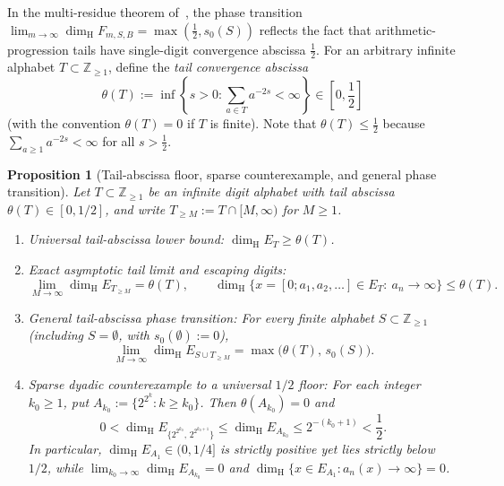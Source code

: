 \documentclass[11pt]{article}
\newtheorem{proposition}[theorem]{Proposition}
\theoremstyle{definition}
\theoremstyle{remark}
\newcommand{\Z}{\mathbb{Z}}
\newcommand{\dimH}{\dim_{\mathrm{H}}}
\begin{document}
In the multi-residue theorem of~\cite{Paper2}, the phase
transition $\lim_{m\to\infty}\dimH F_{m,S,B}=\max(\frac12,s_0(S))$ reflects
the fact that arithmetic-progression tails have single-digit convergence
abscissa $\frac12$. For an arbitrary infinite alphabet $T\subset\Z_{\ge1}$,
define the \emph{tail convergence abscissa}
\[
\theta(T):=\inf\left\{s>0:\sum_{a\in T}a^{-2s}<\infty\right\}\in\left[0,\frac12\right]
\]
(with the convention $\theta(T)=0$ if $T$ is finite). Note that
$\theta(T)\le\frac12$ because $\sum_{a\ge1}a^{-2s}<\infty$ for all
$s>\frac12$.

\begin{proposition}[Tail-abscissa floor, sparse counterexample, and general phase transition]\label{prop:sparse-tail-phase}
Let $T\subset\Z_{\ge1}$ be an infinite digit alphabet with tail abscissa
$\theta(T)\in[0,1/2]$, and write $T_{\ge M}:=T\cap[M,\infty)$ for $M\ge1$.
\begin{enumerate}[label=\textup{(\roman*)},leftmargin=2.2em]
\item \emph{Universal tail-abscissa lower bound:}
$\dimH E_T\ge\theta(T)$.
\item \emph{Exact asymptotic tail limit and escaping digits:}
\[
\lim_{M\to\infty}\dimH E_{T_{\ge M}}=\theta(T),
\qquad
\dimH\bigl\{x=[0;a_1,a_2,\dots]\in E_T:\ a_n\to\infty\bigr\}\le\theta(T).
\]
\item \emph{General tail-abscissa phase transition:}
For every finite alphabet $S\subset\Z_{\ge1}$ (including $S=\emptyset$, with
$s_0(\emptyset):=0$),
\begin{equation}\label{eq:general-tail-phase}
\lim_{M\to\infty}\dimH E_{S\cup T_{\ge M}}=\max\bigl(\theta(T),\,s_0(S)\bigr).
\end{equation}
\item \emph{Sparse dyadic counterexample to a universal $1/2$ floor:}
For each integer $k_0\ge1$, put $A_{k_0}:=\{2^{2^k}:k\ge k_0\}$. Then
$\theta(A_{k_0})=0$ and
\begin{equation}\label{eq:sparse-bounds}
0<\dimH E_{\{2^{2^{k_0}},\,2^{2^{k_0+1}}\}}
\le \dimH E_{A_{k_0}}
\le 2^{-(k_0+1)}
<\frac12.
\end{equation}
In particular, $\dimH E_{A_1}\in(0,1/4]$ is strictly positive yet lies
strictly below~$1/2$, while $\lim_{k_0\to\infty}\dimH E_{A_{k_0}}=0$ and
$\dimH\{x\in E_{A_1}:a_n(x)\to\infty\}=0$.
\end{enumerate}
\end{proposition}
\end{document}
